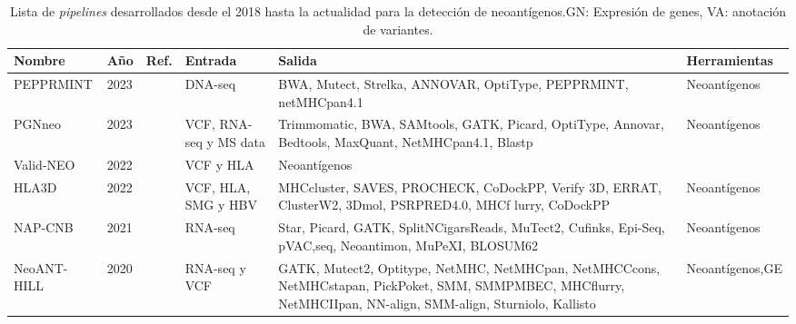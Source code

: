 \documentclass[a4paper,11pt]{article}
\begin{document}
	
\begin{table}[h]
	\caption{Lista de \textit{pipelines} desarrollados desde el 2018 hasta la actualidad para la detección de neoantígenos.GN: Expresión de genes, VA: anotación de variantes.}
	\label{tab:review_pipelines}
 \centering
	\setlength{\tabcolsep}{0.5em} %
	{\renewcommand{\arraystretch}{1.8}%
    {\footnotesize
    \begin{tabular}{lllp{2cm}p{8.5cm}p{2cm}}
	\textbf{Nombre} & \textbf{Año}  & \textbf{Ref.}                                 & \textbf{Entrada}                                         & \textbf{Salida}    & \textbf{Herramientas}                                 \\ \hline
	
	PEPPRMINT         & 2023 &\cite{zhou2023prioritizing}         & DNA-seq                                                  & BWA, Mutect, Strelka, ANNOVAR, OptiType, PEPPRMINT, netMHCpan4.1 & Neoantígenos                                        \\

	PGNneo & 2023	& \cite{tan2023pgnneo}	& VCF, RNA-seq y MS data & Trimmomatic, BWA, SAMtools, GATK, Picard, OptiType, Annovar, Bedtools, MaxQuant, NetMHCpan4.1, Blastp	& Neoantígenos \\
	
	Valid-NEO       & 2022 &\cite{terai2022valid}             & VCF y HLA          & Neoantígenos  \\
	
	HLA3D & 2022	& \cite{li2022hla3d}	& VCF, HLA, SMG y HBV	& MHCcluster, SAVES, PROCHECK, CoDockPP, Verify 3D, ERRAT, ClusterW2, 3Dmol, PSRPRED4.0, MHCf lurry, CoDockPP & Neoantígenos \\
	
	
	
	NAP-CNB         & 2021 &\cite{wert2021predicting}         & RNA-seq                                                  & Star, Picard, GATK, SplitNCigarsReads, MuTect2, Cufinks, Epi-Seq, pVAC,seq, Neoantimon, MuPeXI, BLOSUM62 &  Neoantígenos                                       \\
	
	NeoANT-HILL     & 2020 &\cite{coelho2020neoant}           & RNA-seq y VCF                   & GATK, Mutect2, Optitype, NetMHC, NetMHCpan, NetMHCCcons, NetMHCstapan, PickPoket, SMM, SMMPMBEC, MHCflurry, NetMHCIIpan, NN-align, SMM-align, Sturniolo, Kallisto     & Neoantígenos,GE  \\
	

\end{tabular}}}
\end{table}
\end{document}
